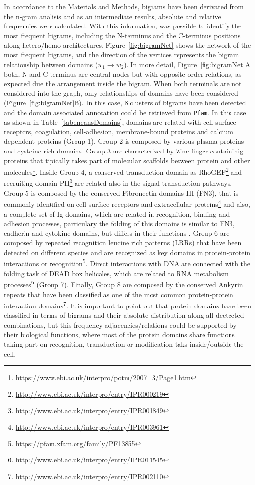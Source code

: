 \documentclass[11pt]{article}
\begin{document}
In accordance to the Materials and Methods, bigrams have been derivated from the
n-gram analisis and as an intermediate results, absolute and relative frequencies
were calculated. With this information, was possible to identify the most 
frequent bigrams, including the N-terminus and the C-terminus positions along hetero/homo 
architectures. Figure~\ref{fig:bigramNet} shows the network of the most
frequent bigrams, and the direction of the vertices represents the bigram 
relationship between domains ($w_1 \rightarrow w_2$). In more detail,
Figure~\ref{fig:bigramNet}A both, N and C-terminus are central nodes 
but with opposite order relations, as expected due the arrangement inside the bigram. 
When both terminals are not considered into the graph, only relationships of 
domains have been considered (Figure~\ref{fig:bigramNet}B). In this case, 
$8$ clusters of bigrams have been detected and the domain associated annotation 
could be retrieved from \texttt{Pfam}. In this case as shown in 
Table~\ref{tab:meansDomains}, domains are related with cell surface receptors, 
coagulation, cell-adhesion, membrane-bound proteins and calcium dependent 
proteins (Group 1). Group 2 is composed by various plasma proteins and cysteine-rich 
domains. Group 3 are characterized by Zinc finger containinig proteins
that tipically takes part of molecular scaffolds between protein and other molecules\footnote{
\url{https://www.ebi.ac.uk/interpro/potm/2007_3/Page1.htm}}. Inside Group 4, a conserved
transduction domain as RhoGEF\footnote{\url{http://www.ebi.ac.uk/interpro/entry/IPR000219}} 
and recruiting domain PH\footnote{\url{http://www.ebi.ac.uk/interpro/entry/IPR001849}}
are related also in the signal transduction pathways. Group 5 is composed by the conserved
Fibronectin domains III (FN3), that is commonly identified on cell-surface receptors 
and extracellular proteins\footnote{\url{http://www.ebi.ac.uk/interpro/entry/IPR003961}} 
and also, a complete set of Ig domains, which are related in recognition, binding and 
adhesion processes, particulary the folding of this domains is similar to FN3, cadherin and 
cytokine domains, but differs in their functions \cite{Barclay:2003}. Group 6 are
composed by repeated recognition leucine rich patterns (LRRs) that have been 
detected on different species and are recognized as key domains in protein-protein 
interactions or recognition\footnote{\url{https://pfam.xfam.org/family/PF13855}}. 
Direct interactions with DNA are connected with the folding task of DEAD box helicales, 
which are related to RNA metabolism processes\footnote{\url{http://www.ebi.ac.uk/interpro/entry/IPR011545}}
(Group 7). Finally, Group 8 are composed by the conserved Ankyrin repeats that have
been classified as one of the most common protein-protein interaction 
domains\footnote{\url{http://www.ebi.ac.uk/interpro/entry/IPR002110}}. 
It is important to point out that protein domains have been classified in terms of 
bigrams and their absolute distribution along all dectected combinations, but this
frequency adjacencies/relations could be supported by their biological functions, where
most of the protein domains share functions taking part on recognition, 
transduction or modification taks inside/outside the cell.
\end{document}

